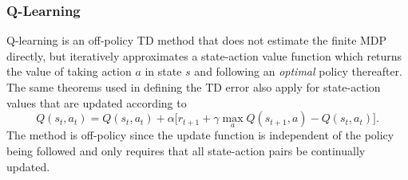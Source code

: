 \subsubsection{Q-Learning}
\label{sec:qlearning}
%
Q-learning \cite{watkins:1989} is an off-policy TD method that does not estimate
the finite MDP directly, but iteratively approximates a state-action value
function which returns the value of taking action $a$ in state $s$ and
following an \textit{optimal} policy thereafter. The same theorems used in
defining the TD error also apply for state-action values that are updated
according to
\begin{equation}
\label{eq:qlearning}
Q(s_t,a_t) = Q(s_t,a_t) + \alpha \bigl[r_{t+1} + \gamma\max_a
Q(s_{t+1},a)-Q(s_t,a_t) \bigr].
\end{equation}
The method is off-policy since the update function is independent of the policy
being followed and only requires that all state-action pairs be continually
updated.

